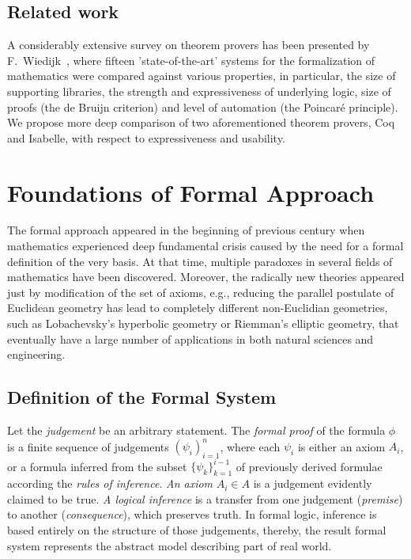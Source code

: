 \documentclass[article]{aaltoseries}
\begin{document}
\subsection{Related work}
A considerably extensive survey on theorem provers has been presented by F.~Wiedijk~\cite{Wie03}, where fifteen 'state-of-the-art' systems for the formalization of mathematics were compared against various properties, in particular, the size of supporting libraries, the strength and expressiveness of underlying logic, size of proofs (the de Bruijn criterion) and level of automation (the Poincaré principle). We propose more deep comparison of two aforementioned theorem provers, Coq and Isabelle, with respect to expressiveness and usability.




\section{Foundations of Formal Approach}
\label{sec:formal_theory}

The formal approach appeared in the beginning of previous century when mathematics experienced deep fundamental crisis caused by the need for a formal definition of the very basis. At that time, multiple paradoxes in several fields of mathematics have been discovered. Moreover, the radically new theories appeared just by modification of the set of axioms, e.g., reducing the parallel postulate of Euclidean geometry has lead to completely different non-Euclidian geometries, such as Lobachevsky's hyperbolic geometry or Riemman's elliptic geometry, that eventually have a large number of applications in both natural sciences and engineering.


\subsection{Definition of the Formal System}
\label{sec:definitions}


Let the \textit{judgement} be an arbitrary statement. The \textit{formal proof} of the formula $\phi$ is a finite sequence of judgements $ ( \psi_i )_{i=1}^{n} $, where each $\psi_i$ is either an axiom $A_i$, or a formula inferred from the subset $\{ \psi_k \}_{k=1}^{i-1}$ of previously derived formulae according the \textit{rules of inference}. \textit{An axiom} $A_i \in A$ is a judgement evidently claimed to be true. \textit{A logical inference} is a transfer from one judgement (\textit{premise}) to another (\textit{consequence}), which preserves truth. In formal logic, inference is based entirely on the structure of those judgements, thereby, the result formal system represents the abstract model describing part of real world.
\end{document}

